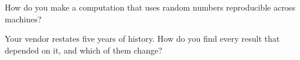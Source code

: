 \begin{interviewq}\label{iq:rs:build-a-research-workflow:5}
How do you make a computation that uses random numbers reproducible across machines?
\end{interviewq}

\begin{interviewq}\label{iq:rs:build-a-research-workflow:6}
Your vendor restates five years of history. How do you find every result that depended on it, and which of them change?
\end{interviewq}
